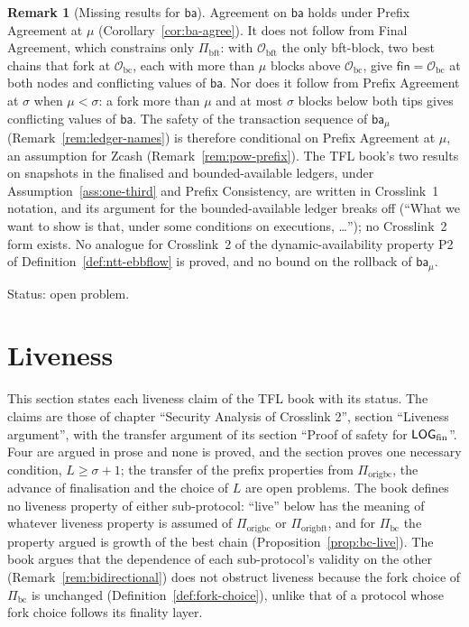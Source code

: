 \documentclass[11pt,a4paper]{article}
\theoremstyle{definition}
\newtheorem{remark}[theorem]{Remark}
\newcommand{\bc}{\mathrm{bc}}
\newcommand{\bft}{\mathrm{bft}}
\newcommand{\Origin}{\mathcal{O}}
\newcommand{\Obc}{\Origin_{\bc}}
\newcommand{\Obft}{\Origin_{\bft}}
\newcommand{\Piorigbc}{\Pi_{\mathrm{origbc}}}
\newcommand{\Piorigbft}{\Pi_{\mathrm{origbft}}}
\newcommand{\Pibc}{\Pi_{\bc}}
\newcommand{\Pibft}{\Pi_{\bft}}
\newcommand{\fin}{\mathsf{fin}}
\newcommand{\ba}{\mathsf{ba}}
\begin{document}
\begin{remark}[Missing results for $\ba$]\label{rem:ba-missing}
Agreement on $\ba$ holds under Prefix Agreement at $\mu$
(Corollary~\ref{cor:ba-agree}). It does not follow from Final Agreement,
which constrains only $\Pibft$: with $\Obft$ the only bft-block, two best chains
that fork at $\Obc$, each with more than $\mu$ blocks above $\Obc$, give
$\fin = \Obc$ at both nodes and conflicting values of $\ba$. Nor does it follow
from Prefix Agreement at $\sigma$ when $\mu < \sigma$: a fork more than $\mu$
and at most $\sigma$ blocks below both tips gives conflicting values of $\ba$.
The safety of the transaction sequence of $\ba_\mu$
(Remark~\ref{rem:ledger-names}) is therefore conditional on Prefix Agreement
at $\mu$, an assumption for Zcash (Remark~\ref{rem:pow-prefix}). The TFL
book's two results on
snapshots in the finalised and bounded-available ledgers,
under Assumption~\ref{ass:one-third} and Prefix Consistency, are written in
Crosslink~1 notation, and its argument for the bounded-available ledger
breaks off (``What we want to show is that, under some conditions on
executions, \ldots''); no Crosslink~2 form exists. No analogue for
Crosslink~2 of the dynamic-availability property P2 of
Definition~\ref{def:ntt-ebbflow} is proved, and no bound on the rollback of
$\ba_\mu$.

Status: open problem.
\end{remark}

\section{Liveness}\label{sec:live}

This section states each liveness claim of the TFL book with its status. The
claims are those of chapter ``Security Analysis of Crosslink 2'', section
``Liveness argument'', with the transfer argument of its section ``Proof of
safety for $\LOGfin$''. Four are argued in prose and none is proved, and the
section proves one necessary condition, $L \ge \sigma + 1$; the
transfer of the prefix properties from $\Piorigbc$, the advance of
finalisation and the choice of $L$ are open problems. The book defines no
liveness property of either sub-protocol: ``live'' below has the meaning of
whatever liveness property is assumed of $\Piorigbc$ or $\Piorigbft$, and for
$\Pibc$ the property argued is growth of the best chain
(Proposition~\ref{prop:bc-live}). The book argues that the dependence of each
sub-protocol's validity on the other (Remark~\ref{rem:bidirectional}) does not
obstruct liveness because the fork choice of $\Pibc$ is unchanged
(Definition~\ref{def:fork-choice}), unlike that of a protocol whose fork choice
follows its finality layer.
\end{document}
